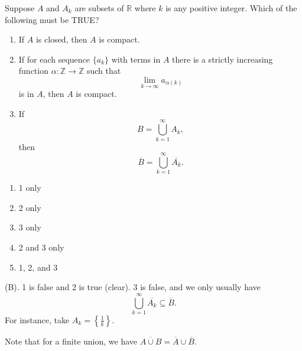 \begin{exercise}
Suppose $A$ and $A_k$ are subsets of $\mathbb{R}$ where $k$ is any positive integer. Which of the following must be TRUE?

\begin{enumerate}
    \item If $A$ is closed, then $A$ is compact.
    
    \item If for each sequence $\{a_k\}$ with terms in $A$ there is a strictly increasing function $\alpha:\mathbb{Z}\to\mathbb{Z}$ such that
    \[
    \lim_{k\to\infty} a_{\alpha(k)}
    \]
    is in $A$, then $A$ is compact.
    
    \item If
    \[
    B=\bigcup_{k=1}^{\infty}A_k,
    \]
    then
    \[
    \overline{B}=\bigcup_{k=1}^{\infty}\overline{A_k}.
    \]
\end{enumerate}
\begin{enumerate}[label=(\Alph*)]
    \item 1 only
    \item 2 only
    \item 3 only
    \item 2 and 3 only
    \item 1, 2, and 3
\end{enumerate}
\end{exercise}
\begin{solution}
(B). 1 is false and 2 is true (clear). 3 is false, and we only usually have 
\[
\bigcup_{k=1}^{\infty}\overline{A_k} \subseteq \overline{B}.
\]
For instance, take $A_k = \left\{\frac{1}{k}\right\}$.
\end{solution}

\begin{remark}
Note that for a finite union, we have $\overline{A \cup B} = \overline{A} \cup \overline{B}$.
\end{remark}

